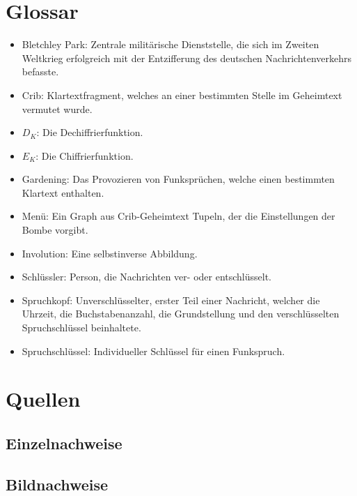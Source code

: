 \documentclass[ngerman, a4paper, footsepline, headsepline, 9pt]{scrreport}
\begin{document}
	\newpage
	\chapter{Glossar}\label{sec:glossar}
	\begin{itemize}
		\item Bletchley Park: Zentrale militärische Dienststelle, die sich im Zweiten Weltkrieg erfolgreich mit der Entzifferung des deutschen Nachrichtenverkehrs befasste.
		\item Crib: Klartextfragment, welches an einer bestimmten Stelle im Geheimtext vermutet wurde.
		\item $D_K$: Die Dechiffrierfunktion.
		\item $E_K$: Die Chiffrierfunktion.
		\item Gardening: Das Provozieren von Funksprüchen, welche einen bestimmten Klartext enthalten.
		\item Menü: Ein Graph aus Crib-Geheimtext Tupeln, der die Einstellungen der Bombe vorgibt.
		\item Involution: Eine selbstinverse Abbildung.
		\item Schlüssler: Person, die Nachrichten ver- oder entschlüsselt.
		\item Spruchkopf: Unverschlüsselter, erster Teil einer Nachricht, welcher die Uhrzeit, die Buchstabenanzahl, die Grundstellung und den verschlüsselten Spruchschlüssel beinhaltete.
		\item Spruchschlüssel:  Individueller Schlüssel für einen Funkspruch.
	\end{itemize}
	
	\chapter{Quellen}\label{ch:sources}
	\section{Einzelnachweise}\label{sec:einzelnachweise}
	\printbibliography[keyword=sources, heading=none, title={}]
	\section{Bildnachweise}\label{sec:bildnachweise}
	\printbibliography[keyword=pictures, heading=none, title={}]
	\nocite{*}
	\thispagestyle{plain}
	
	
	\appendix
	
\end{document}
